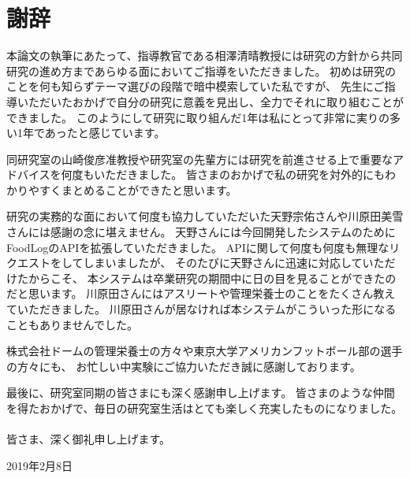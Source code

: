 \newpage
\thispagestyle{empty}

\chapter*{謝辞}

本論文の執筆にあたって、指導教官である相澤清晴教授には研究の方針から共同研究の進め方まであらゆる面においてご指導をいただきました。
初めは研究のことを何も知らずテーマ選びの段階で暗中模索していた私ですが、
先生にご指導いただいたおかげで自分の研究に意義を見出し、全力でそれに取り組むことができました。
このようにして研究に取り組んだ1年は私にとって非常に実りの多い1年であったと感じています。

同研究室の山崎俊彦准教授や研究室の先輩方には研究を前進させる上で重要なアドバイスを何度もいただきました。
皆さまのおかげで私の研究を対外的にもわかりやすくまとめることができたと思います。

研究の実務的な面において何度も協力していただいた天野宗佑さんや川原田美雪さんには感謝の念に堪えません。
天野さんには今回開発したシステムのためにFoodLogのAPIを拡張していただきました。
APIに関して何度も何度も無理なリクエストをしてしまいましたが、
そのたびに天野さんに迅速に対応していただけたからこそ、
本システムは卒業研究の期間中に日の目を見ることができたのだと思います。
川原田さんにはアスリートや管理栄養士のことをたくさん教えていただきました。
川原田さんが居なければ本システムがこういった形になることもありませんでした。

株式会社ドームの管理栄養士の方々や東京大学アメリカンフットボール部の選手の方々にも、
お忙しい中実験にご協力いただき誠に感謝しております。

最後に、研究室同期の皆さまにも深く感謝申し上げます。
皆さまのような仲間を得たおかげで、毎日の研究室生活はとても楽しく充実したものになりました。 \\ \\

皆さま、深く御礼申し上げます。

\begin{flushright}
  \vspace{15mm}
  2019年2月8日 \hspace{2cm}
\end{flushright}
